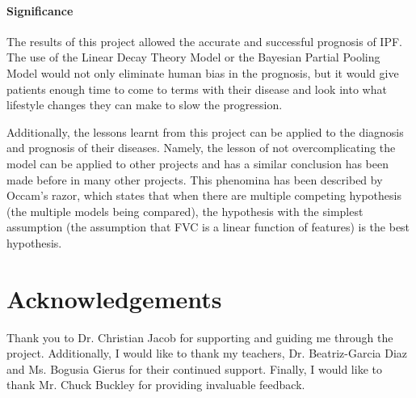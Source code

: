 \documentclass[12pt]{article}
\begin{document}
\paragraph*{Significance}

The results of this project allowed the accurate and successful prognosis of IPF. 
The use of the Linear Decay Theory Model or the Bayesian Partial Pooling Model would not only eliminate human bias in the prognosis, but it would give patients enough time to come to terms with their disease and look into what lifestyle changes they can make to slow the progression.

Additionally, the lessons learnt from this project can be applied to the diagnosis and prognosis of their diseases. 
Namely, the lesson of not overcomplicating the model can be applied to other projects and has a similar conclusion has been made before in many other projects. 
This phenomina has been described by Occam's razor, which states that when there are multiple competing hypothesis (the multiple models being compared), the hypothesis with the simplest assumption (the assumption that FVC is a linear function of features) is the best hypothesis.

\section{Acknowledgements}

Thank you to Dr. Christian Jacob for supporting and guiding me through the project.
Additionally, I would like to thank my teachers, Dr. Beatriz-Garcia Diaz and Ms. Bogusia Gierus for their continued support.
Finally, I would like to thank Mr. Chuck Buckley for providing invaluable feedback.

\newpage
\printbibliography
\end{document}
